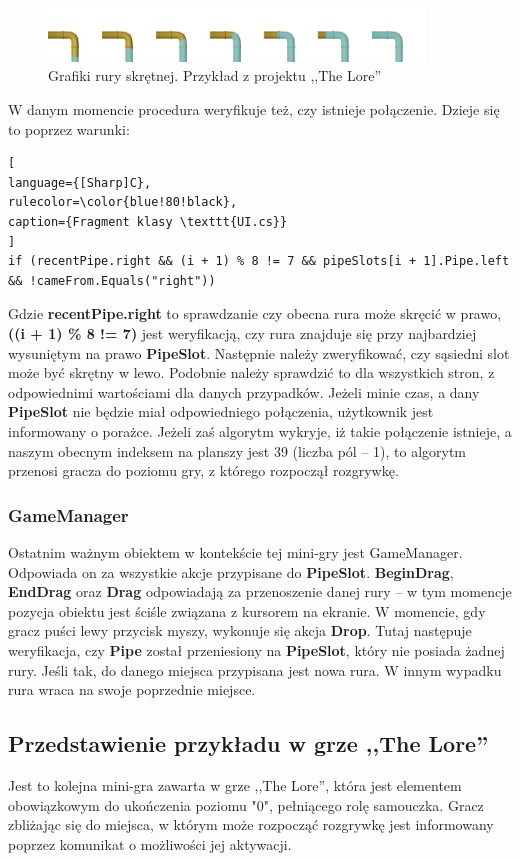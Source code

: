 \documentclass[oneside,polski,logo]{amuthesis}
\begin{document}
\begin{figure}[h]
	\centering
	\includegraphics[width=10cm]{images/tyrek/rury-5.png}
	\caption{Grafiki rury skrętnej. Przykład z projektu ,,The Lore''}
\end{figure}
W danym momencie procedura weryfikuje też, czy istnieje połączenie. Dzieje się to poprzez warunki:
\begin{lstlisting}[
language={[Sharp]C},
rulecolor=\color{blue!80!black},
caption={Fragment klasy \texttt{UI.cs}}
]
if (recentPipe.right && (i + 1) % 8 != 7 && pipeSlots[i + 1].Pipe.left 
&& !cameFrom.Equals("right"))
\end{lstlisting}
Gdzie \textbf{recentPipe.right} to sprawdzanie czy obecna rura może skręcić w prawo, \textbf{((i + 1) \% 8 != 7)} jest weryfikacją, czy rura znajduje się przy najbardziej wysuniętym na prawo \textbf{PipeSlot}. Następnie należy zweryfikować, czy sąsiedni slot może być skrętny w lewo. Podobnie należy sprawdzić to dla wszystkich stron, z odpowiednimi wartościami dla danych przypadków. Jeżeli minie czas, a dany \textbf{PipeSlot} nie będzie miał odpowiedniego połączenia, użytkownik jest informowany o porażce. Jeżeli zaś algorytm wykryje, iż takie połączenie istnieje, a naszym obecnym indeksem na planszy jest 39 (liczba pól – 1), to algorytm przenosi gracza do poziomu gry, z którego rozpoczął rozgrywkę.

\subsubsection{GameManager}
\par Ostatnim ważnym obiektem w kontekście tej mini-gry jest GameManager. Odpowiada on za wszystkie akcje przypisane do \textbf{PipeSlot}. \textbf{BeginDrag}, \textbf{EndDrag} oraz \textbf{Drag} odpowiadają za przenoszenie danej rury – w tym momencje pozycja obiektu jest ściśle związana z kursorem na ekranie. W momencie, gdy gracz puści lewy przycisk myszy, wykonuje się akcja \textbf{Drop}. Tutaj następuje weryfikacja, czy \textbf{Pipe} został przeniesiony na \textbf{PipeSlot}, który nie posiada żadnej rury. Jeśli tak, do danego miejsca przypisana jest nowa rura. W innym wypadku rura wraca na swoje poprzednie miejsce. 
\subsection{Przedstawienie przykładu w grze ,,The Lore''}
\par Jest to kolejna mini-gra zawarta w grze ,,The Lore'', która jest elementem obowiązkowym do ukończenia poziomu "0", pełniącego rolę samouczka. Gracz zbliżając się do miejsca, w którym może rozpocząć rozgrywkę jest informowany poprzez komunikat o możliwości jej aktywacji.
\end{document}
